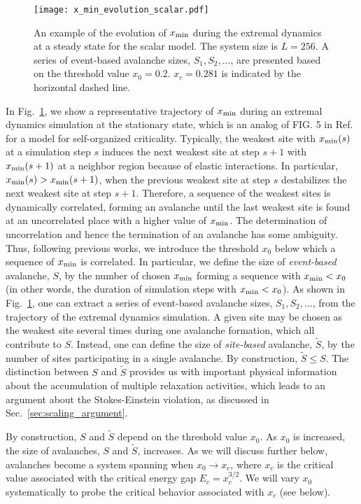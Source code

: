 \documentclass[pre,twocolumn,superscriptaddress,tightenlines,showpacs,longbibliography,floatfix,footinbib]{revtex4-1}
\begin{document}
\begin{figure}
\centering
\texttt{[image: x\_min\_evolution\_scalar.pdf]}
\caption{
An example of the evolution of $x_{\rm min}$ during the extremal dynamics at a steady state for the scalar model. The system size is $L=256$.
A series of event-based avalanche sizes, $S_1, S_2, ...$, are presented based on the threshold value $x_0=0.2$.
$x_c=0.281$ is indicated by the horizontal dashed line.
}
\label{fig:x_min_evolution}
\end{figure}


In Fig.~\ref{fig:x_min_evolution}, we show a representative trajectory of $x_{\rm min}$ during an extremal dynamics simulation at the stationary state, which is an analog of FIG. 5 in Ref.~\cite{paczuski1996avalanche} for a model for self-organized criticality.
Typically, the weakest site with $x_{\rm min}(s)$ at a simulation step $s$ induces the next weakest site at step $s+1$ with $x_{\rm min}(s+1)$ at a neighbor region because of elastic interactions. In particular, $x_{\rm min}(s) > x_{\rm min}(s+1)$, when the previous weakest site at step $s$ destabilizes the next weakest site at step $s+1$. Therefore, a sequence of the weakest sites is dynamically correlated, forming an avalanche until the last weakest site is found at an uncorrelated place with a higher value of $x_{\rm min}$. The determination of uncorrelation and hence the termination of an avalanche has some ambiguity. Thus, following previous works, we introduce the threshold $x_0$ below which a sequence of $x_{\rm min}$ is correlated.
In particular, we define the size of {\it event-based} avalanche, $S$, by the number of chosen $x_{\rm min}$ forming a sequence with $x_{\rm min}<x_0$ (in other words, the duration of simulation steps with $x_{\rm min}<x_0$). As shown in Fig.~\ref{fig:x_min_evolution}, one can extract a series of event-based avalanche sizes, $S_1, S_2,...$, from the trajectory of the extremal dynamics simulation.
A given site may be chosen as the weakest site several times during one avalanche formation, which all contribute to $S$. 
Instead, one can define the size of {\it site-based} avalanche, $\tilde S$, by the number of sites participating in a single avalanche. By construction, $\tilde S \leq S$. The distinction between $S$ and $\tilde S$ provides us with important physical information about the accumulation of multiple relaxation activities, which leads to an argument about the Stokes-Einstein violation, as discussed in Sec.~\ref{sec:scaling_argument}.

By construction, $S$ and $\tilde S$ depend on the threshold value $x_0$. As $x_0$ is increased, the size of avalanches, $S$ and $\tilde S$, increases.
As we will discuss further below, avalanches become a system spanning when $x_0 \to x_c$, where $x_c$ is the critical value associated with the critical energy gap $E_c=x_c^{3/2}$. We will vary $x_0$ systematically to probe the critical behavior associated with $x_c$ (see below).
\end{document}
